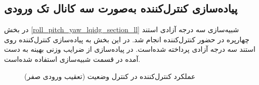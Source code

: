 \subsection{پیاده‌سازی کنترل‌کننده به‌صورت سه کانال تک ورودی}\label{lqidg_siso}
در بخش
\ref{roll_pitch_yaw_lqidg_section_ll}
شبیه‌سازی سه درجه آزادی استند چهارپره در حضور کنترل‌کننده  انجام شد. در این بخش به پیاده‌سازی کنترل‌کننده  روی استند سه درجه آزادی پرداخته شده‌است.
در پیاده‌سازی از ضرایب وزنی بهینه به دست آمده در قسمت شبیه‌سازی استفاده شده‌است.


\begin{figure}[H]
	\centering
	\caption{‫‪عملکرد کنترل‌کننده  در کنترل وضعیت (تعقیب ورودی صفر)}
\end{figure}



